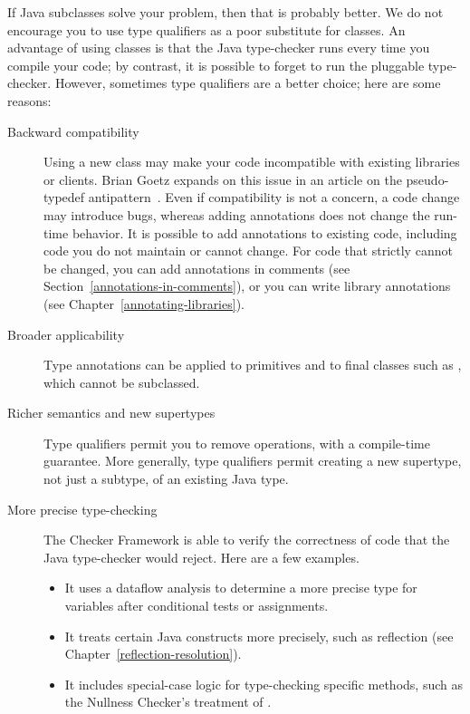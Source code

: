 If  Java subclasses solve your problem, then that is probably better.
We do not encourage you to use type qualifiers as a poor substitute for
classes.  An advantage of using classes is that the Java type-checker
runs every time you compile your code;
by contrast, it is possible to forget to run the pluggable
type-checker.  However, sometimes type qualifiers are a
better choice; here are some reasons:

\begin{description}

\item[Backward compatibility]
Using a new class may make your code incompatible with existing libraries or
clients.  Brian Goetz expands on this issue in an article on the
pseudo-typedef antipattern~\cite{Goetz2006:typedef}.  Even if compatibility
is not a concern, a code change may introduce bugs, whereas adding
annotations does not change the run-time behavior.  It is possible to add
annotations to existing code, including code you do not maintain or cannot
change.  For code that strictly cannot be changed, you can add
annotations in comments (see Section~\ref{annotations-in-comments}), or you
can write library annotations (see Chapter~\ref{annotating-libraries}).

\item[Broader applicability]
Type annotations can be applied to primitives and to final classes such as
, which cannot be subclassed.

\item[Richer semantics and new supertypes]
Type qualifiers permit you to remove operations, with a compile-time
guarantee.  More
generally, type qualifiers permit creating a new supertype, not just a
subtype, of an existing Java type.

\item[More precise type-checking]
The Checker Framework is able to verify the correctness of code that the
Java type-checker would reject.  Here are a few examples.
\begin{itemize}
\item
  It uses a dataflow analysis to determine a more precise type for
  variables after conditional tests or assignments.
\item
  It treats certain Java constructs more precisely, such as
  reflection (see Chapter~\ref{reflection-resolution}).
\item
  It includes special-case logic for type-checking specific methods, such
  as the Nullness Checker's treatment of .
\end{itemize}



\end{description}
